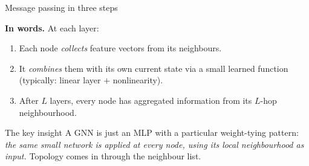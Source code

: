\documentclass[aspectratio=169,10pt]{beamer}
\begin{document}
\begin{frame}{Message passing in three steps}
\centering
{}
\vspace{0.6em}
\textbf{In words.} At each layer:
\begin{enumerate}
  \item Each node \emph{collects} feature vectors from its neighbours.
  \item It \emph{combines} them with its own current state via a small learned function (typically: linear layer $+$ nonlinearity).
  \item After $L$ layers, every node has aggregated information from its $L$-hop neighbourhood.
\end{enumerate}
\vspace{0.4em}
\begin{block}{The key insight}
A GNN is just an MLP with a particular weight-tying pattern: \emph{the same small network is applied at every node, using its local neighbourhood as input.} Topology comes in through the neighbour list.
\end{block}
\end{frame}
\end{document}
